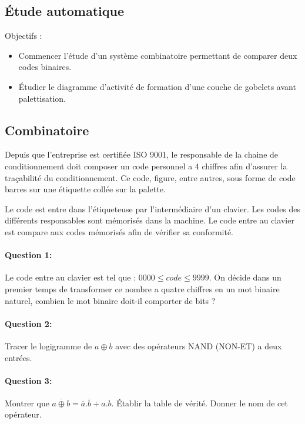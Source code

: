 \subsection{Étude automatique}

Objectifs :
\begin{itemize}
 \item Commencer l'étude d'un système combinatoire permettant de comparer deux codes binaires.
 \item Étudier le diagramme d'activité de formation d'une couche de gobelets avant palettisation.
\end{itemize}

\subsection{Combinatoire}

Depuis que l'entreprise est certifiée ISO 9001, le responsable de la chaine de conditionnement doit composer un code personnel a 4 chiffres afin d'assurer la traçabilité du conditionnement. Ce code, figure, entre autres, sous forme de code barres sur une étiquette collée sur la palette.

Le code est entre dans l'étiqueteuse par l'intermédiaire d'un clavier. Les codes des différents responsables sont mémorisés dans la machine. Le code entre au clavier est compare aux codes mémorisés afin de vérifier sa conformité.

\paragraph{Question 1:} Le code entre au clavier est tel que : $0000 \leq code \leq 9999$. On décide dans un premier temps de transformer ce nombre a quatre chiffres en un mot binaire naturel, combien le mot binaire doit-il comporter de bits ?

\paragraph{Question 2:} Tracer le logigramme de $a \oplus b$ avec des opérateurs NAND (NON-ET) a deux entrées.

\paragraph{Question 3:} Montrer que $\overline{a \oplus b} = \overline{a}.\overline{b} + a.b$. Établir la table de vérité. Donner le nom de cet opérateur.

